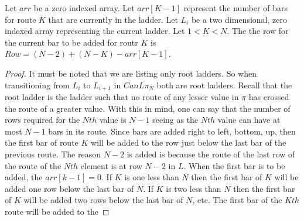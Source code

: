 \begin{theorem}
  Let $arr$ be a zero indexed array. Let $arr[K-1]$ represent the number of bars for route $K$ that are currently in the 
  ladder. Let $L_{i}$ be a two dimensional, zero indexed array representing the current ladder.
  Let $1 < K < N$. The the row for the current bar to be added for routr $K$ is $Row=(N-2) + (N-K) - arr[K-1]$.
\end{theorem}
\begin{proof}
  It must be noted that we are listing only root ladders. So when transitioning from 
$L_{i}$ to $L_{i+1}$ in $CanL{\pi_{N}}$ both are root ladders. Recall that the root ladder is the ladder such that no  
route of any lesser value in $\pi$ has crossed the route of a greater value. With this in mind, one can say that the 
number of rows required for the $Nth$ value is $N-1$ seeing as the $Nth$ value can have at most $N-1$ bars in its route. 
Since bars are added right to left, bottom, up, then the first bar of route $K$ will be added to the row 
just  below the last bar of the previous route. The reason $N-2$ is added is because the route of the last row of the route of the $Nth$ element is 
at row $N-2$ in $L$. When the first bar is to be added, the $arr[k-1]=0$. If $K$ is one less than $N$ then 
the first bar of $K$ will be added one row below the last bar of $N$. If $K$ is two less than $N$ then the first bar 
of $K$ will be added two rows below the last bar of $N$, etc. The first bar of the $Kth$ route 
will be added to the 
\end{proof}
